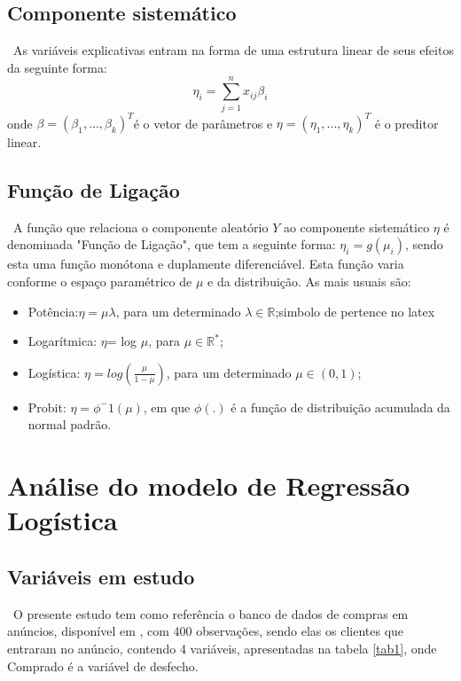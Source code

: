 \documentclass[a4paper]{article}
\begin{document}
\subsection{Componente sistemático}
\quad \ As variáveis explicativas entram na forma de uma estrutura linear de seus efeitos da seguinte forma:
\begin{equation*}
    \eta_i=\sum_{j=1}^nx_{ij}\beta_i
\end{equation*}
onde $\beta=(\beta_1,...,\beta_k)^T$é o vetor de parâmetros e $\eta=(\eta_1,...,\eta_k)^T$ é o preditor linear.

\subsection{Função de Ligação}
\quad \ A função que relaciona o componente aleatório $Y$ ao componente sistemático $\eta$ é denominada "Função de Ligação", que tem a seguinte forma: $\eta_i=g(\mu_i)$, sendo esta uma função monótona e duplamente diferenciável. Esta função varia conforme o espaço paramétrico de $\mu$ e da distribuição. As mais usuais são:
\begin{itemize}
    \item Potência:$\eta = \mu\lambda$, para um determinado $\lambda \in \mathbb{R}$;simbolo de pertence no latex
    \item Logarítmica: $\eta$= log $\mu$, para $\mu \in \mathbb{R}^*$;
    \item Logística: $\eta=log(\frac{\mu}{1-\mu})$, para um determinado $\mu \in (0,1)$;
    \item Probit: $\eta=\phi^-1(\mu)$, em que $\phi(.)$ é a função de distribuição acumulada da normal padrão.
\end{itemize}


\section{Análise do modelo de Regressão Logística}

\subsection{Variáveis em estudo}

\quad \ O presente estudo tem como referência o banco de dados de compras em anúncios, disponível em \cite{kaggle}, com 400 observações, sendo elas os clientes que entraram no anúncio, contendo 4 variáveis, apresentadas na tabela \ref{tab1}, onde Comprado é a variável de desfecho. 
\end{document}
